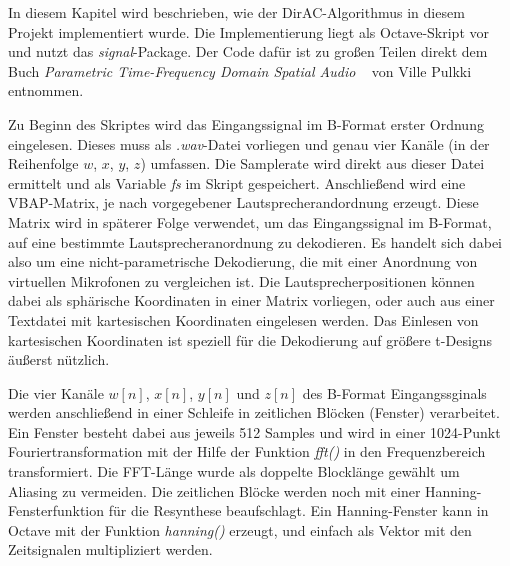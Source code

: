 In diesem Kapitel wird beschrieben, wie der DirAC-Algorithmus in diesem Projekt implementiert wurde. Die Implementierung liegt als Octave-Skript vor und nutzt das \textit{signal}-Package. Der Code dafür ist zu großen Teilen direkt dem Buch \textit{Parametric Time-Frequency Domain Spatial Audio} ~\cite{spatial-book} von Ville Pulkki entnommen.

Zu Beginn des Skriptes wird das Eingangssignal im B-Format erster Ordnung eingelesen. Dieses muss als \textit{.wav}-Datei vorliegen und genau vier Kanäle (in der Reihenfolge $w$, $x$, $y$, $z$) umfassen. Die Samplerate wird direkt aus dieser Datei ermittelt und als Variable \textit{fs} im Skript gespeichert. Anschließend wird eine VBAP-Matrix, je nach vorgegebener Lautsprecherandordnung erzeugt. Diese Matrix wird in späterer Folge verwendet, um das Eingangssignal im B-Format, auf eine bestimmte Lautsprecheranordnung zu dekodieren. Es handelt sich dabei also um eine nicht-parametrische Dekodierung, die mit einer Anordnung von virtuellen Mikrofonen zu vergleichen ist. Die Lautsprecherpositionen können dabei als sphärische Koordinaten in einer Matrix vorliegen, oder auch aus einer Textdatei mit kartesischen Koordinaten eingelesen werden. Das Einlesen von kartesischen Koordinaten ist speziell für die Dekodierung auf größere t-Designs äußerst nützlich.

Die vier Kanäle $w[n]$, $x[n]$, $y[n]$ und $z[n]$ des B-Format Eingangssginals werden anschließend in einer Schleife in zeitlichen Blöcken (Fenster) verarbeitet. Ein Fenster besteht dabei aus jeweils 512 Samples und wird in einer 1024-Punkt Fouriertransformation mit der Hilfe der Funktion \textit{fft()} in den Frequenzbereich transformiert. Die FFT-Länge wurde als doppelte Blocklänge gewählt um Aliasing zu vermeiden. Die zeitlichen Blöcke werden noch mit einer Hanning-Fensterfunktion für die Resynthese beaufschlagt. Ein Hanning-Fenster kann in Octave mit der Funktion \textit{hanning()} erzeugt, und einfach als Vektor mit den Zeitsignalen multipliziert werden.
